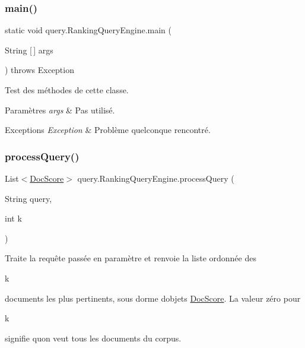 \subsubsection{\texorpdfstring{main()}{main()}}
{\footnotesize\ttfamily static void query.\+Ranking\+Query\+Engine.\+main (\begin{DoxyParamCaption}\item[{String \mbox{[}$\,$\mbox{]}}]{args }\end{DoxyParamCaption}) throws Exception\hspace{0.3cm}{\ttfamily [static]}}

Test des méthodes de cette classe.


\begin{DoxyParams}{Paramètres}
{\em args} & Pas utilisé.\\
\hline
\end{DoxyParams}

\begin{DoxyExceptions}{Exceptions}
{\em Exception} & Problème quelconque rencontré. \\
\hline
\end{DoxyExceptions}
\mbox{\label{classquery_1_1RankingQueryEngine_ac69937232cafd9108d96ef3657735682}} 
\subsubsection{\texorpdfstring{process\+Query()}{processQuery()}}
{\footnotesize\ttfamily List$<$\hyperlink{classquery_1_1DocScore}{Doc\+Score}$>$ query.\+Ranking\+Query\+Engine.\+process\+Query (\begin{DoxyParamCaption}\item[{String}]{query,  }\item[{int}]{k }\end{DoxyParamCaption})}

Traite la requête passée en paramètre et renvoie la liste ordonnée des
\begin{DoxyCode}
k 
\end{DoxyCode}
 documents les plus pertinents, sous dorme d\textquotesingle{}objets \hyperlink{classquery_1_1DocScore}{Doc\+Score}. La valeur zéro pour
\begin{DoxyCode}
k 
\end{DoxyCode}
 signifie qu\textquotesingle{}on veut tous les documents du corpus.


